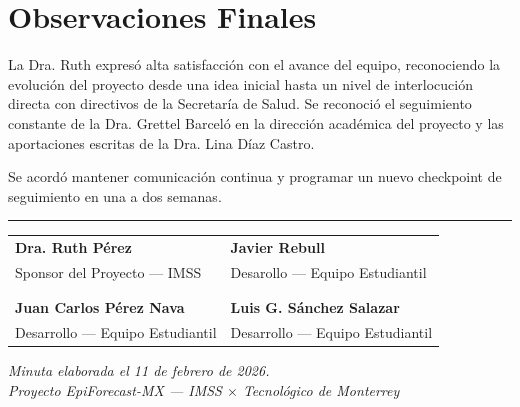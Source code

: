 \documentclass[11pt, a4paper]{article}
\begin{document}
\vspace{0.5cm}

\section{Observaciones Finales}

La Dra. Ruth expresó alta satisfacción con el avance del equipo, reconociendo la evolución del proyecto desde una idea inicial hasta un nivel de interlocución directa con directivos de la Secretaría de Salud. Se reconoció el seguimiento constante de la Dra. Grettel Barceló en la dirección académica del proyecto y las aportaciones escritas de la Dra. Lina Díaz Castro.

Se acordó mantener comunicación continua y programar un nuevo checkpoint de seguimiento en una a dos semanas.

\vspace{1.5cm}

\begin{center}
    {\color{imssgreen}\rule{0.9\textwidth}{1pt}}
\end{center}

\vspace{0.5cm}

\noindent
\begin{tabularx}{\textwidth}{XX}
    \centering\textbf{Dra. Ruth Pérez} & \centering\textbf{Javier Rebull} \tabularnewline
    \centering\small\color{imssgray} Sponsor del Proyecto --- IMSS & \centering\small\color{imssgray} Desarollo --- Equipo Estudiantil \tabularnewline
    & \tabularnewline
    & \tabularnewline
    \centering\textbf{Juan Carlos Pérez Nava} & \centering\textbf{Luis G. Sánchez Salazar} \tabularnewline
    \centering\small\color{imssgray} Desarrollo --- Equipo Estudiantil & \centering\small\color{imssgray} Desarrollo --- Equipo Estudiantil \tabularnewline
\end{tabularx}

\vspace{1cm}

\begin{center}
    {\small\color{imssgray}\textit{Minuta elaborada el 11 de febrero de 2026.}}\\
    {\small\color{imssgray}\textit{Proyecto EpiForecast-MX --- IMSS $\times$ Tecnológico de Monterrey}}
\end{center}
\end{document}
